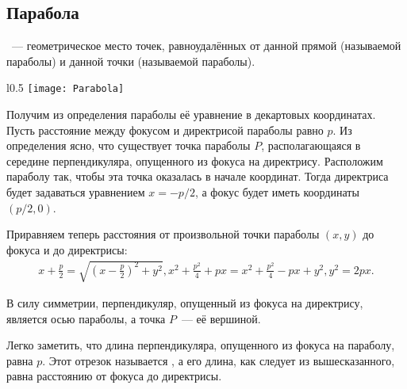 \subsection{Парабола}
~--- геометрическое место точек, равноудалённых от данной прямой (называемой  параболы) и данной точки (называемой  параболы).

\begin{wrapfigure}[11]{l}{0.5\tw}
	\centering
	\vspace{-.7pc}
	\texttt{[image: Parabola]}
\end{wrapfigure}
Получим из определения параболы её уравнение в декартовых координатах. Пусть расстояние между фокусом и директрисой параболы равно $p$. Из определения ясно, что существует точка параболы $P$, располагающаяся в середине перпендикуляра, опущенного из фокуса на директрису. Расположим параболу так, чтобы эта точка оказалась в начале координат. Тогда директриса будет задаваться уравнением $x = -p/2$, а фокус будет иметь координаты $(p/2, 0)$.

Приравняем теперь расстояния от произвольной точки параболы $(x, y)$ до фокуса и до директрисы:
\begin{gather*}
	x + \frac{p}{2} = \sqrt{\left(x - \frac{p}{2} \right)^2 + y^2},
	x^2 + \frac{p^2}{4} + px = x^2 + \frac{p^2}{4} - px + y^2,
	y^2 = 2px. \tag{\theequation}
\end{gather*}

В силу симметрии, перпендикуляр, опущенный из фокуса на директрису, является осью параболы, а точка $P$~--- её вершиной.

Легко заметить, что длина перпендикуляра, опущенного из фокуса на параболу, равна $p$. Этот отрезок называется , а его длина, как следует из вышесказанного, равна расстоянию от фокуса до директрисы.


